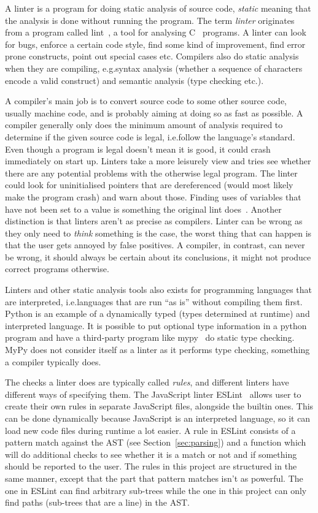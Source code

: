 \documentclass[a4paper,12pt]{article}
\begin{document}
A linter is a program for doing static analysis of source code, \emph{static} meaning that
the analysis is done without running the program. The term \emph{linter} originates from a
program called lint~\cite{lint}, a tool for analysing C~\cite{c1978} programs. A linter can look for
bugs, enforce a certain code style, find some kind of improvement, find error prone
constructs, point out special cases etc. Compilers also do static analysis when they are
compiling, e.g.\@ syntax analysis (whether a sequence of characters encode a valid
construct) and semantic analysis (type checking etc.\@).

A compiler's main job is to convert source code to some other source code, usually machine
code, and is probably aiming at doing so as fast as possible. A compiler generally only
does the minimum amount of analysis required to determine if the given source code is
legal, i.e.\@ follow the language's standard. Even though a program is legal doesn't mean
it is good, it could crash immediately on start up. Linters take a more leisurely view and
tries see whether there are any potential problems with the otherwise legal program. The
linter could look for uninitialised pointers that are dereferenced (would most likely make
the program crash) and warn about those. Finding uses of variables that have not been set
to a value is something the original lint does~\cite{lint}. Another distinction is that
linters aren't as precise as compilers. Linter can be wrong as they only need to
\emph{think} something is the case, the worst thing that can happen is that the user gets
annoyed by false positives. A compiler, in contrast, can never be wrong, it should always
be certain about its conclusions, it might not produce correct programs otherwise.

Linters and other static analysis tools also exists for programming languages that are
interpreted, i.e.\@ languages that are run ``as is'' without compiling them first. Python
is an example of a dynamically typed (types determined at runtime) and interpreted
language. It is possible to put optional type information in a python program and have a
third-party program like mypy~\cite{mypy} do static type checking. MyPy does not
consider itself as a linter as it performs type checking, something a compiler typically
does.

The checks a linter does are typically called \emph{rules}, and different linters have
different ways of specifying them. The JavaScript linter ESLint~\cite{ESLint} allows user
to create their own rules in separate JavaScript files, alongside the builtin ones. This
can be done dynamically because JavaScript is an interpreted language, so it can load new
code files during runtime a lot easier. A rule in ESLint
consists of a pattern match against the AST (see Section~\ref{sec:parsing}) and a function
which will do additional checks to see whether it is a match or not and if something
should be reported to the user. The rules in this project are structured in the same
manner, except that the part that pattern matches isn't as powerful. The one in ESLint can
find arbitrary sub-trees while the one in this project can only find paths (sub-trees that
are a line) in the AST.
\end{document}
